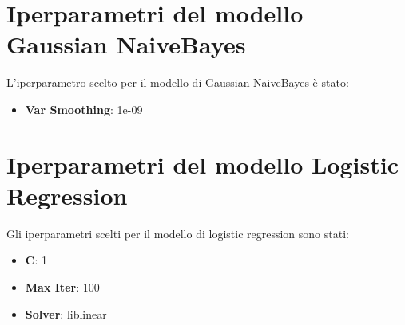 \documentclass[../../Thesis.tex]{subfiles}
\begin{document}
\section*{Iperparametri del modello Gaussian NaiveBayes}
L'iperparametro scelto per il modello di Gaussian NaiveBayes è stato:
\begin{itemize}
    \item \textbf{Var Smoothing}: 1e-09
\end{itemize}

\section*{Iperparametri del modello Logistic Regression}
Gli iperparametri scelti per il modello di logistic regression sono stati:
\begin{itemize}
    \item \textbf{C}: 1
    \item \textbf{Max Iter}: 100
    \item \textbf{Solver}: liblinear
\end{itemize}
\end{document}
